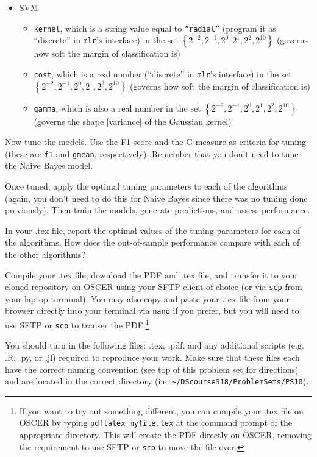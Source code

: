 \documentclass[12pt,english]{exam}
\begin{document}
\begin{questions}
\begin{itemize}
\begin{itemize}
    \end{itemize}
\item SVM
    \begin{itemize}
    \item \texttt{kernel}, which is a string value equal to \texttt{``radial''} (program it as ``discrete'' in \texttt{mlr}'s interface) in the set $\left\{2^{-2},2^{-1},2^{0},2^{1},2^{2},2^{10}\right\}$ (governs how soft the margin of classification is)
    \item \texttt{cost}, which is a real number (``discrete'' in \texttt{mlr}'s interface) in the set $\left\{2^{-2},2^{-1},2^{0},2^{1},2^{2},2^{10}\right\}$ (governs how soft the margin of classification is)
    \item \texttt{gamma}, which is also a real number in the set $\left\{2^{-2},2^{-1},2^{0},2^{1},2^{2},2^{10}\right\}$ (governs the shape [variance] of the Gaussian kernel) 
    \end{itemize}
\end{itemize}


\question Now tune the models. Use the F1 score and the G-measure as criteria for tuning (these are \texttt{f1} and \texttt{gmean}, respectively). Remember that you don't need to tune the Naive Bayes model.

\question Once tuned, apply the optimal tuning parameters to each of the algorithms (again, you don't need to do this for Naive Bayes since there was no tuning done previously). Then train the models, generate predictions, and assess performance.

\question In your .tex file, report the optimal values of the tuning parameters for each of the algorithms. How does the out-of-sample performance compare with each of the other algorithms?

\question Compile your .tex file, download the PDF and .tex file, and transfer it to your cloned repository on OSCER using your SFTP client of choice (or via \texttt{scp} from your laptop terminal). You may also copy and paste your .tex file from your browser directly into your terminal via \texttt{nano} if you prefer, but you will need to use SFTP or \texttt{scp} to transer the PDF.\footnote{If you want to try out something different, you can compile your .tex file on OSCER by typing \texttt{pdflatex myfile.tex} at the command prompt of the appropriate directory. This will create the PDF directly on OSCER, removing the requirement to use SFTP or \texttt{scp} to move the file over.}

\question You should turn in the following files: .tex, .pdf, and any additional scripts (e.g. .R, .py, or .jl) required to reproduce your work.  Make sure that these files each have the correct naming convention (see top of this problem set for directions) and are located in the correct directory (i.e. \texttt{\textasciitilde/DScourseS18/ProblemSets/PS10}).


\end{questions}
\end{document}
